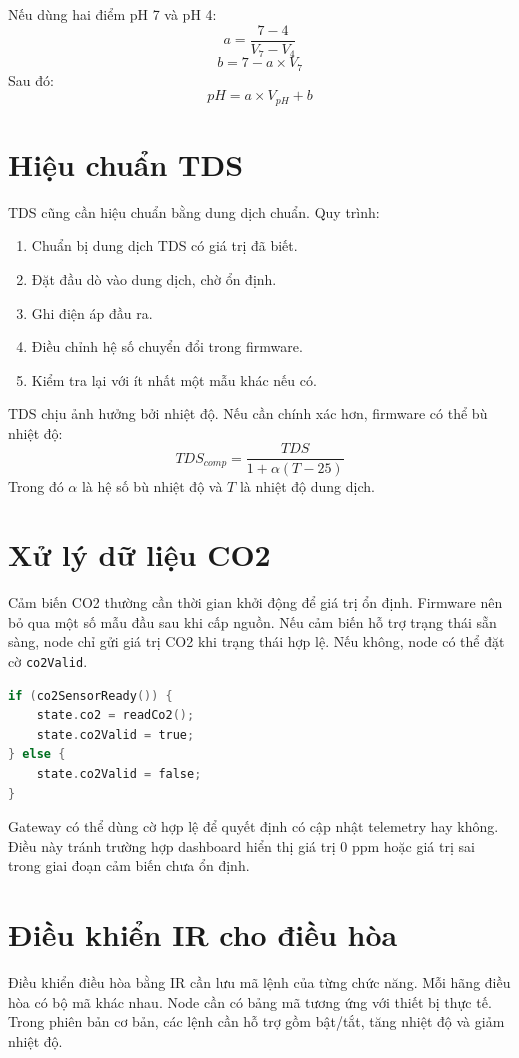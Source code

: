 Nếu dùng hai điểm pH 7 và pH 4:
\[
a = \frac{7 - 4}{V_7 - V_4}
\]
\[
b = 7 - a \times V_7
\]
Sau đó:
\[
pH = a \times V_{pH} + b
\]

\section{Hiệu chuẩn TDS}
TDS cũng cần hiệu chuẩn bằng dung dịch chuẩn. Quy trình:
\begin{enumerate}
    \item Chuẩn bị dung dịch TDS có giá trị đã biết.
    \item Đặt đầu dò vào dung dịch, chờ ổn định.
    \item Ghi điện áp đầu ra.
    \item Điều chỉnh hệ số chuyển đổi trong firmware.
    \item Kiểm tra lại với ít nhất một mẫu khác nếu có.
\end{enumerate}

TDS chịu ảnh hưởng bởi nhiệt độ. Nếu cần chính xác hơn, firmware có thể bù nhiệt độ:
\[
TDS_{comp} = \frac{TDS}{1 + \alpha (T - 25)}
\]
Trong đó $\alpha$ là hệ số bù nhiệt độ và $T$ là nhiệt độ dung dịch.

\section{Xử lý dữ liệu CO2}
Cảm biến CO2 thường cần thời gian khởi động để giá trị ổn định. Firmware nên bỏ qua một số mẫu đầu sau khi cấp nguồn. Nếu cảm biến hỗ trợ trạng thái sẵn sàng, node chỉ gửi giá trị CO2 khi trạng thái hợp lệ. Nếu không, node có thể đặt cờ \texttt{co2Valid}.

\begin{lstlisting}[language=C,caption={Kiểm tra dữ liệu CO2 trước khi gửi}]
if (co2SensorReady()) {
    state.co2 = readCo2();
    state.co2Valid = true;
} else {
    state.co2Valid = false;
}
\end{lstlisting}

Gateway có thể dùng cờ hợp lệ để quyết định có cập nhật telemetry hay không. Điều này tránh trường hợp dashboard hiển thị giá trị 0 ppm hoặc giá trị sai trong giai đoạn cảm biến chưa ổn định.

\section{Điều khiển IR cho điều hòa}
Điều khiển điều hòa bằng IR cần lưu mã lệnh của từng chức năng. Mỗi hãng điều hòa có bộ mã khác nhau. Node cần có bảng mã tương ứng với thiết bị thực tế. Trong phiên bản cơ bản, các lệnh cần hỗ trợ gồm bật/tắt, tăng nhiệt độ và giảm nhiệt độ.

